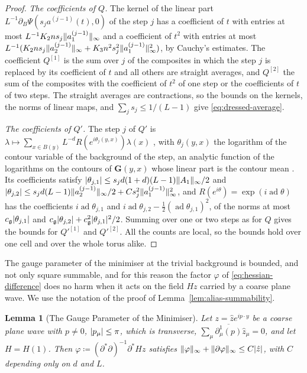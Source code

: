 \documentclass[11pt]{preprint}
\DeclarePairedDelimiter{\abs}{\lvert}{\rvert}
\DeclarePairedDelimiter{\norm}{\lVert}{\rVert}
\numberwithin{equation}{section}
\newtheorem{lemma}{Lemma}[section]
\theoremstyle{definition}
\theoremstyle{remark}
\theoremstyle{plain}
\begin{document}
\begin{proof}
\emph{The coefficients of $Q$.} The kernel of the linear part $L^{-1}\partial_B\Psi(s_ja^{(j-1)}(t), 0)$ of the step $j$ has a coefficient of $t$ with entries at most $L^{-1}K_2ns_j\norm{a^{(j-1)}_1}_\infty$ and a coefficient of $t^2$ with entries at most $L^{-1}(K_2ns_j\norm{a^{(j-1)}_2}_\infty + K_3n^2s_j^2\norm{a^{(j-1)}_1}_\infty^2)$, by Cauchy's estimates. The coefficient $Q^{[1]}$ is the sum over $j$ of the composites in which the step $j$ is replaced by its coefficient of $t$ and all others are straight averages, and $Q^{[2]}$ the sum of the composites with the coefficient of $t^2$ of one step or the coefficients of $t$ of two steps. The straight averages are contractions, so the bounds on the kernels, the norms of linear maps, and $\sum_js_j \leq 1/(L - 1)$ give \eqref{eq:dressed-average}.

\emph{The coefficients of $Q'$.} The step $j$ of $Q'$ is $\lambda \mapsto \sum_{x\in B(y)}L^{-d}R(e^{i\theta_j(y, x)})\lambda(x)$ \cite[(3.19), p.~393]{BalabanPBG}, with $\theta_j(y, x)$ the logarithm of the contour variable of the background of the step, an analytic function of the logarithms on the contours of $\mathbf G(y, x)$ whose linear part is the contour mean \cite[(0.8)]{BalabanRG1}. Its coefficients satisfy $\abs{\theta_{j,1}} \leq s_jd(1 + d)(L - 1)\norm{A_1}_\infty/2$ and $\abs{\theta_{j,2}} \leq s_jd(L - 1)\norm{a^{(j-1)}_2}_\infty/2 + Cs_j^2\norm{a^{(j-1)}_1}_\infty^2$, and $R(e^{i\theta}) = \exp(i\operatorname{ad}\theta)$ has the coefficients $i\operatorname{ad}\theta_{j,1}$ and $i\operatorname{ad}\theta_{j,2} - \frac12(\operatorname{ad}\theta_{j,1})^2$, of the norms at most $c_{\mathfrak g}\abs{\theta_{j,1}}$ and $c_{\mathfrak g}\abs{\theta_{j,2}} + c_{\mathfrak g}^2\abs{\theta_{j,1}}^2/2$. Summing over one or two steps as for $Q$ gives the bounds for $Q'^{[1]}$ and $Q'^{[2]}$. All the counts are local, so the bounds hold over one cell and over the whole torus alike.
\end{proof}

The gauge parameter of the minimiser at the trivial background is bounded, and not only square summable, and for this reason the factor $\varphi$ of \eqref{eq:hessian-difference} does no harm when it acts on the field $Hz$ carried by a coarse plane wave. We use the notation of the proof of Lemma~\ref{lem:alias-summability}.

\begin{lemma}[The Gauge Parameter of the Minimiser]\label{lem:gauge-parameter}
Let $z = \hat ze^{ip\cdot y}$ be a coarse plane wave with $p \neq 0$, $\abs{p_\mu} \leq \pi$, which is transverse, $\sum_\mu\overline{\partial^1_\mu(p)}\hat z_\mu = 0$, and let $H = H(1)$. Then $\varphi \coloneqq (\partial^*\partial)^{-1}\partial^*Hz$ satisfies $\norm{\varphi}_\infty + \norm{\partial\varphi}_\infty \leq C\abs{\hat z}$, with $C$ depending only on $d$ and $L$.
\end{lemma}
\end{document}
